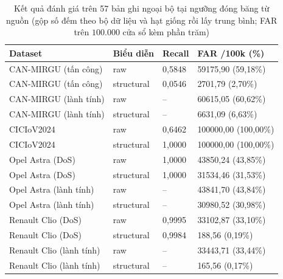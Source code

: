 \documentclass[12pt, a4paper, reqno, oneside]{book}
\begin{document}
{\renewcommand{\arraystretch}{0.85}
\begin{table}[htbp]\centering\footnotesize
\caption[Kết quả đánh giá trên các bộ dữ liệu ngoại bộ tại ngưỡng nguồn]{Kết quả đánh giá trên 57 bản ghi ngoại bộ tại ngưỡng đóng băng từ nguồn (gộp số đếm theo bộ dữ liệu và hạt giống rồi lấy trung bình; FAR trên $100.000$ cửa sổ kèm phần trăm)}\label{tab:extension-external}
\begin{tabular}{P{4.2cm}P{2.8cm}P{1.6cm}P{3.6cm}}
\toprule
Dataset & Biểu diễn & Recall & FAR /100k (\%)\\\midrule
CAN-MIRGU (tấn công) & raw & 0,5848 & 59175,90 (59,18\%)\\
CAN-MIRGU (tấn công) & structural & 0,0546 & 2701,79 (2,70\%)\\
CAN-MIRGU (lành tính) & raw & -- & 60615,05 (60,62\%)\\
CAN-MIRGU (lành tính) & structural & -- & 6631,09 (6,63\%)\\
CICIoV2024 & raw & 0,6462 & 100000,00 (100,00\%)\\
CICIoV2024 & structural & 1,0000 & 100000,00 (100,00\%)\\
Opel Astra (DoS) & raw & 1,0000 & 43850,24 (43,85\%)\\
Opel Astra (DoS) & structural & 1,0000 & 31534,46 (31,53\%)\\
Opel Astra (lành tính) & raw & -- & 43841,70 (43,84\%)\\
Opel Astra (lành tính) & structural & -- & 30980,52 (30,98\%)\\
Renault Clio (DoS) & raw & 0,9995 & 33102,87 (33,10\%)\\
Renault Clio (DoS) & structural & 0,9984 & 188,56 (0,19\%)\\
Renault Clio (lành tính) & raw & -- & 33443,71 (33,44\%)\\
Renault Clio (lành tính) & structural & -- & 165,56 (0,17\%)\\
\bottomrule\end{tabular}
\end{table}}
\end{document}
